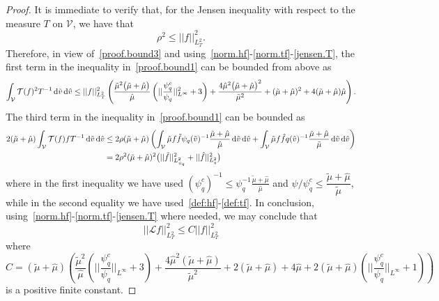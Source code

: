 \documentclass[a4paper]{article}
\theoremstyle{Theorem}\newtheorem{proposition}{Proposition}[section]
\theoremstyle{Remark}\newtheorem{remark}{Remark}[section]
\theoremstyle{Theorem}\newtheorem{theorem}{Theorem}[section]
\newcommand{\hv}{\hat{v}}
\newcommand{\tv}{\tilde{v}}
\newcommand{\hf}{\hat{f}}
\newcommand{\tf}{\tilde{f}}
\newcommand{\hmu}{\hat{\mu}}
\newcommand{\tmu}{\tilde{\mu}}
\newcommand{\intV}{\int_{\mathcal{V}}}
\begin{document}
\begin{proof}
It is immediate to verify that, for the Jensen inequality with respect to the measure $T$ on $\mathcal{V}$, we have that
\begin{equation}\label{jensen.T}
 \rho^2 \le ||f||^2_{L^2_T}.
 \end{equation}
 Therefore, in view of~\eqref{proof.bound3} and using~\eqref{norm.hf}-\eqref{norm.tf}-\eqref{jensen.T},  the first term in the inequality in~\eqref{proof.bound1} can be bounded from above as
 \[
  \intV \mathcal{T}(f)^2 T^{-1} \, {\rm d} \tv \, {\rm d}\hv \le ||f||^2_{L^2_T} \left(   \dfrac{\tmu^2\big(\tmu+\hmu\big)}{\hmu} \left(|| \dfrac{\psi_q^c}{\psi_q}||^2_{L^\infty}+3\right) +\dfrac{4\hmu^2\big(\tmu+\hmu\big)^2}{\tmu^2}  +(\tmu+\hmu)^2+4(\tmu+\hmu)\hmu\right).
 \]
 The third term in the inequality in~\eqref{proof.bound1} can be bounded as
 \[
 \begin{split}
 2  (\tmu +\hmu) \intV \mathcal{T}(f) f T^{-1}   \, {\rm d} \tv \, {\rm d}\hv &\le 2 \rho (\tmu +\hmu) \left(\intV \hmu f \tf \psi_q(\tv)^{-1}\dfrac{\tmu+\hmu}{\hmu}   \, {\rm d} \tv \, {\rm d}\hv + \intV \tmu f \hf q(\hv)^{-1}\dfrac{\tmu+\hmu}{\tmu}   \, {\rm d} \tv \, {\rm d}\hv\right)\\
 &= 2\rho^2 (\tmu+\hmu)^2 \big(|| \tf ||^2_{L^2_{\psi_q}}+|| \hf ||^2_{L^2_{q}}\big)
 \end{split}
 \]
 where in the first inequality we have used $(\psi_q^{c})^{-1}\le \psi_q^{-1}\frac{\tmu+\hmu}{\hmu}$ and $\psi/\psi_q^c \le \dfrac{\tmu+\hmu}{\tmu}$, while in the second equality we have used~\eqref{def:hf}-\eqref{def:tf}.
  In conclusion, using~\eqref{norm.hf}-\eqref{norm.tf}-\eqref{jensen.T} where needed, we may conclude that
 \[
  || \mathcal{L}f||^2_{L^2_T} \le C ||f||^2_{L^2_T}
 \]
 where
 \[
C = \left(\tmu+\hmu\right)\left(  \dfrac{\tmu^2}{\hmu}\left(|| \dfrac{\psi_q^c}{\psi_q} ||_{L^\infty}+3\right) + \dfrac{4\hmu^2\left(\tmu+\hmu\right)}{\tmu^2} +2\left(\tmu+\hmu\right)+4\hmu+2\left(\tmu+\hmu\right)\left(|| \dfrac{\psi_q^c}{\psi_q} ||_{L^\infty}+1\right)\right)
 \] is a positive finite constant. 
\end{proof}









\end{document}

